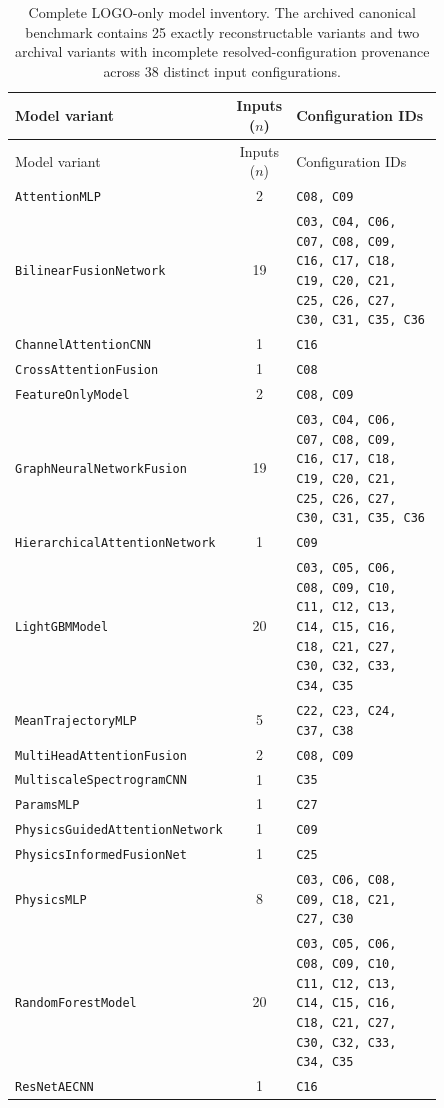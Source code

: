 \begin{longtable}{@{}p{0.42\linewidth}cp{0.43\linewidth}@{}}
\caption{Complete LOGO-only model inventory. The archived canonical benchmark contains 25 exactly reconstructable variants and two archival variants with incomplete resolved-configuration provenance across 38 distinct input configurations.}\label{tab:supp-model-inventory}\\
\toprule
Model variant & Inputs ($n$) & Configuration IDs \\
\midrule
\endfirsthead
\toprule
Model variant & Inputs ($n$) & Configuration IDs \\
\midrule
\endhead
\texttt{AttentionMLP} & 2 & \texttt{C08, C09} \\
\texttt{BilinearFusionNetwork} & 19 & \texttt{C03, C04, C06, C07, C08, C09, C16, C17, C18, C19, C20, C21, C25, C26, C27, C30, C31, C35, C36} \\
\texttt{ChannelAttentionCNN} & 1 & \texttt{C16} \\
\texttt{CrossAttentionFusion} & 1 & \texttt{C08} \\
\texttt{FeatureOnlyModel} & 2 & \texttt{C08, C09} \\
\texttt{GraphNeuralNetworkFusion} & 19 & \texttt{C03, C04, C06, C07, C08, C09, C16, C17, C18, C19, C20, C21, C25, C26, C27, C30, C31, C35, C36} \\
\texttt{HierarchicalAttentionNetwork} & 1 & \texttt{C09} \\
\texttt{LightGBMModel} & 20 & \texttt{C03, C05, C06, C08, C09, C10, C11, C12, C13, C14, C15, C16, C18, C21, C27, C30, C32, C33, C34, C35} \\
\texttt{MeanTrajectoryMLP} & 5 & \texttt{C22, C23, C24, C37, C38} \\
\texttt{MultiHeadAttentionFusion} & 2 & \texttt{C08, C09} \\
\texttt{MultiscaleSpectrogramCNN} & 1 & \texttt{C35} \\
\texttt{ParamsMLP} & 1 & \texttt{C27} \\
\texttt{PhysicsGuidedAttentionNetwork} & 1 & \texttt{C09} \\
\texttt{PhysicsInformedFusionNet} & 1 & \texttt{C25} \\
\texttt{PhysicsMLP} & 8 & \texttt{C03, C06, C08, C09, C18, C21, C27, C30} \\
\texttt{RandomForestModel} & 20 & \texttt{C03, C05, C06, C08, C09, C10, C11, C12, C13, C14, C15, C16, C18, C21, C27, C30, C32, C33, C34, C35} \\
\texttt{ResNetAECNN} & 1 & \texttt{C16} \\

\end{longtable}
